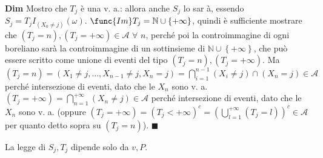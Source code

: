 \documentclass{article}
\begin{document}
\textbf{Dim} Mostro che $T_{j}$ \`{e} una v. a.: allora anche $S_{j}$ lo sar%
\`{a}, essendo $S_{j}=T_{j}I_{\left( X_{0}\neq j\right) }\left( \omega
\right) $. $\func{Im}T_{j}=%
\mathbb{N}
\cup \left\{ +\infty \right\} $, quindi \`{e} sufficiente mostrare che $%
\left( T_{j}=n\right) ,\left( T_{j}=+\infty \right) \in \mathcal{A}$ $%
\forall $ $n$, perch\'{e} poi la controimmagine di ogni boreliano sar\`{a}
la controimmagine di un sottinsieme di $%
\mathbb{N}
\cup \left\{ +\infty \right\} $, che pu\`{o} essere scritto come unione di
eventi del tipo $\left( T_{j}=n\right) ,\left( T_{j}=+\infty \right) $. Ma $%
\left( T_{j}=n\right) =\left( X_{1}\neq j,...,X_{n-1}\neq j,X_{n}=j\right)
=\bigcap_{i=1}^{n-1}\left( X_{i}\neq j\right) \cap \left( X_{n}=j\right) \in 
\mathcal{A}$ perch\'{e} intersezione di eventi, dato che le $X_{n}$ sono v.
a. $\left( T_{j}=+\infty \right) =\bigcap_{n=1}^{+\infty }\left( X_{n}\neq
j\right) \in \mathcal{A}$ perch\'{e} intersezione di eventi, dato che le $%
X_{n}$ sono v. a. (oppure $\left( T_{j}=+\infty \right) =\left(
T_{j}<+\infty \right) ^{c}=\left( \bigcup_{l=1}^{+\infty }\left(
T_{j}=l\right) \right) ^{c}\in \mathcal{A}$ per quanto detto sopra su $%
\left( T_{j}=n\right) $). $\blacksquare $

La legge di $S_{j},T_{j}$ dipende solo da $v,P$.
\end{document}
